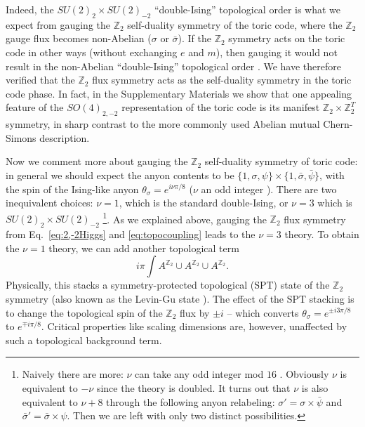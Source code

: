 \documentclass[aps, prl, superscriptaddress, twocolumn,
notitlepage, longbibliography,
floatfix]{revtex4-2}
\newcommand{\1}{\text{\uppercase\expandafter{\romannumeral1}}}
\newcommand{\2}{\text{\uppercase\expandafter{\romannumeral2}}}
\newcommand{\3}{\text{\uppercase\expandafter{\romannumeral3}}}
\newcommand{\4}{\text{\uppercase\expandafter{\romannumeral4}}}
\newcommand{\5}{\text{\uppercase\expandafter{\romannumeral5}}}
\newcommand{\6}{\text{\uppercase\expandafter{\romannumeral6}}}
\def\Z{\mathbb{Z}}
\begin{document}
Indeed, the $SU(2)_2\times SU(2)_{-2}$ ``double-Ising'' topological order is what we expect from gauging the $\Z_2$ self-duality symmetry of the toric code, where the $\Z_2$ gauge flux becomes non-Abelian ($\sigma$ or $\bar{\sigma}$). If the $\Z_2$ symmetry acts on the toric code in other ways (without exchanging $e$ and $m$), then gauging it would not result in the non-Abelian ``double-Ising'' topological order \cite{TeoHughesFradkin}. We have therefore verified that the $\Z_2$ flux symmetry acts as the self-duality symmetry in the toric code phase. In fact, in the Supplementary Materials we show that one appealing feature of the $SO(4)_{2,-2}$ representation of the toric code is its manifest $\mathbb{Z}_2 \times \mathbb{Z}_2^T$ symmetry, in sharp contrast to the more commonly used Abelian mutual Chern-Simons description.

Now we comment more about gauging the $\Z_2$ self-duality symmetry of toric code: in general we should expect the anyon contents to be $\{1,\sigma,\psi\}\times \{1,\bar{\sigma},\bar{\psi}\}$, with the spin of the Ising-like anyon $\theta_{\sigma}=e^{i\nu\pi/8}$ ($\nu$ an odd integer \cite{Kitaev:2005hzj}). There are two inequivalent choices: $\nu=1$, which is the standard double-Ising, or $\nu=3$ which is $SU(2)_2\times SU(2)_{-2}$ \footnote{Naively there are more: $\nu$ can take any odd integer mod $16$ \cite{Kitaev:2005hzj}. Obviously $\nu$ is equivalent to $-\nu$ since the theory is doubled. It turns out that $\nu$ is also equivalent to $\nu+8$ through the following anyon relabeling: $\sigma'=\sigma\times\bar{\psi}$ and $\bar{\sigma}'=\bar{\sigma}\times \psi$. Then we are left with only two distinct possibilities.}. As we explained above, gauging the $\Z_2$ flux symmetry from Eq.~\eqref{eq:2,-2Higgs} and \eqref{eq:topocoupling} leads to the $\nu=3$ theory. To obtain the $\nu=1$ theory, we can add another topological term
\begin{equation}
\label{eq:DWterm}
    i\pi \int A^{\Z_2}\cup A^{\Z_2}\cup A^{\Z_2}.
\end{equation}
Physically, this stacks a symmetry-protected topological (SPT) state of the $\Z_2$ symmetry (also known as the Levin-Gu state \cite{LevinGu}). The effect of the SPT stacking is to change the topological spin of the $\Z_2$ flux by $\pm i$ -- which converts $\theta_{\sigma}=e^{\pm i3\pi/8}$ to $e^{\mp i\pi/8}$. Critical properties like scaling dimensions are, however, unaffected by such a topological background term.
\end{document}
